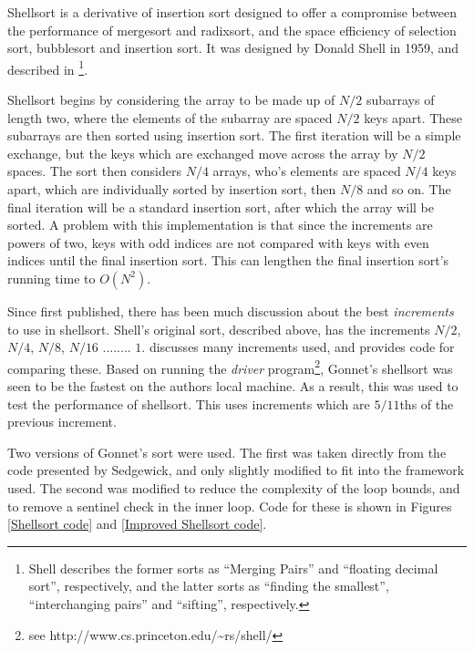 \label{shell}

Shellsort is a derivative of insertion sort designed to offer a compromise
between the performance of mergesort and radixsort, and the space efficiency of
selection sort, bubblesort and insertion sort. It was designed by Donald Shell
in 1959, and described in \cite{Shell59}\footnote{Shell describes the former
sorts as ``Merging Pairs'' and ``floating decimal sort'', respectively, and the
latter sorts as ``finding the smallest'', ``interchanging pairs'' and ``sifting'',
respectively.}.

Shellsort begins by considering the array to be made up of $N/2$ subarrays of
length two, where the elements of the subarray are spaced $N/2$ keys apart.
These subarrays are then sorted using insertion sort. The first iteration will
be a simple exchange, but the keys which are exchanged move across the array by
$N/2$ spaces. The sort then considers $N/4$ arrays, who's elements are spaced
$N/4$ keys apart, which are individually sorted by insertion sort, then $N/8$
and so on. The final iteration will be a standard insertion sort, after which
the array will be sorted. A problem with this implementation is that since the
increments are powers of two, keys with odd indices are not compared with keys
with even indices until the final insertion sort. This can lengthen the final
insertion sort's running time to $O(N^2)$.

Since first published, there has been much discussion about the best
\textit{increments} to use in shellsort. Shell's original sort, described above,
has the increments $N/2$, $N/4$, $N/8$, $N/16$ ........ $1$. \cite{Sedgewick96}
discusses many increments used, and provides code for comparing these. Based
on running the \textit{driver} program\footnote{see
http://www.cs.princeton.edu/\textasciitilde{}rs/shell/}, Gonnet's shellsort was
seen to be the fastest on the authors local machine. As a result, this was used
to test the performance of shellsort. This uses increments which are $5/11$ths
of the previous increment.

Two versions of Gonnet's sort were used. The first was taken directly from the
code presented by Sedgewick, and only slightly modified to fit into the framework used.
The second was modified to reduce the complexity of the loop bounds, and to
remove a sentinel check in the inner loop. Code for these is shown in Figures
\ref{Shellsort code} and \ref{Improved Shellsort code}.

